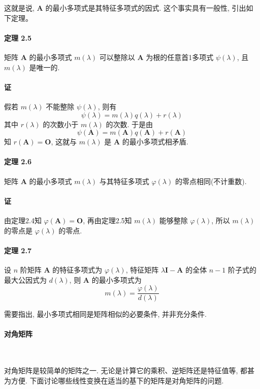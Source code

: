 \par 这就是说, $\bm{A}$ 的最小多项式是其特征多项式的因式. 这个事实具有一般性, 引出如下定理。

\paragraph*{定理 2.5} 矩阵 $\bm{A}$ 的最小多项式 $m(\lambda)$ 可以整除以 $\bm{A}$ 为根的任意首1多项式 $\psi(\lambda)$, 且
$m(\lambda)$ 是唯一的.

\paragraph*{证} 假若 $m(\lambda)$ 不能整除 $\psi(\lambda)$, 则有
$$
    \psi(\lambda) = m(\lambda)q(\lambda) + r(\lambda)
$$
其中 $r(\lambda)$ 的次数小于 $m(\lambda)$ 的次数. 于是由
$$
    \psi(\bm{A}) = m(\bm{A})q(\bm{A}) + r(\bm{A})
$$
知 $r(\bm{A}) = \bm{O}$, 这就与 $m(\lambda)$ 是 $\bm{A}$ 的最小多项式相矛盾.

\paragraph*{定理 2.6} 矩阵 $\bm{A}$ 的最小多项式 $m(\lambda)$ 与其特征多项式 $\varphi(\lambda)$ 的零点相同(不计重数).

\paragraph*{证} 由定理2.4知 $\varphi(\bm{A}) = \bm{O}$, 再由定理2.5知 $m(\lambda)$ 能够整除 $\varphi(\lambda)$, 所以 $m(\lambda)$ 的零点是
$\varphi(\lambda)$ 的零点.

\paragraph*{定理 2.7} 设 $n$ 阶矩阵 $\bm{A}$ 的特征多项式为 $\varphi(\lambda)$, 特征矩阵 $\lambda\bm{I} - \bm{A}$ 的全体 $n - 1$ 阶子式的
最大公因式为 $d(\lambda)$, 则 $\bm{A}$ 的最小多项式为
$$
    m(\lambda) = \dfrac{\varphi(\lambda)}{d(\lambda)}
$$

\par 需要指出, 最小多项式相同是矩阵相似的必要条件, 并非充分条件.

\paragraph[]{对角矩阵} \

\par 对角矩阵是较简单的矩阵之一. 无论是计算它的乘积、逆矩阵还是特征值等, 都甚
为方便. 下面讨论哪些线性变换在适当的基下的矩阵是对角矩阵的问题.


